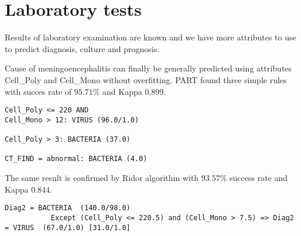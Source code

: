 \documentclass[11pt]{article}
\begin{document}
\section{Laboratory tests}
Results of laboratory examination are known and we have more attributes to use
to predict diagnosis, culture and prognosis.

Cause of meningoencephalitis can finally be generally predicted using attributes Cell\_Poly and Cell\_Mono without overfitting. PART found three simple rules with succes rate of $95.71\%$ and Kappa $0.899$.

\begin{verbatim}
Cell_Poly <= 220 AND
Cell_Mono > 12: VIRUS (96.0/1.0)

Cell_Poly > 3: BACTERIA (37.0)

CT_FIND = abnormal: BACTERIA (4.0)
\end{verbatim}

The same result is confirmed by Ridor algorithm with $93.57\%$ success rate and Kappa $0.844$.
\begin{verbatim}
Diag2 = BACTERIA  (140.0/98.0)
           Except (Cell_Poly <= 220.5) and (Cell_Mono > 7.5) => Diag2 = VIRUS  (67.0/1.0) [31.0/1.0]
\end{verbatim}






% 

% 
% 
\end{document}
